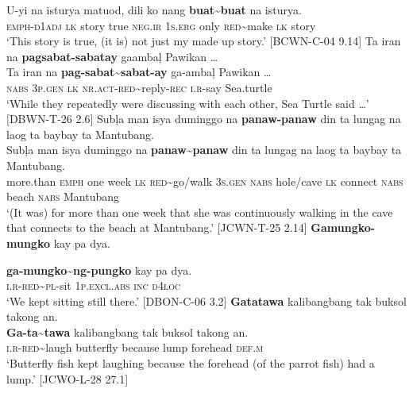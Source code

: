 \gll U-yi  na  isturya  matuod,  dili  ko  nang  \textbf{buat\sim{}buat}  na  isturya. \\
\textsc{emph-d}1\textsc{adj}  \textsc{lk}  story  true  \textsc{neg.ir} 1\textsc{s.erg} only  \textsc{red}\sim{}make  \textsc{lk}  story \\
\glt ‘This story is true, (it is) not just my made up story.’ [BCWN-C-04 9.14]
\z
\ea
Ta  iran  na  \textbf{pagsabat-sabatay}  gaambaļ  Pawikan … \\\smallskip
\gll Ta  iran  na  \textbf{pag-sabat\sim{}sabat-ay}  ga-ambaļ  Pawikan … \\
\textsc{nabs}  3\textsc{p.gen}  \textsc{lk}  \textsc{nr.act-red}\sim{}reply-\textsc{rec}  \textsc{i.r}-say  Sea.turtle \\
\glt ‘While they repeatedly were discussing with each other, Sea Turtle said …’ [DBWN-T-26 2.6]
\z
\ea
Subļa  man  isya  duminggo  na  \textbf{panaw-panaw}  din  ta lungag  na  laog  ta  baybay  ta  Mantubang. \\\smallskip
\gll Subļa  man  isya  duminggo  na  \textbf{panaw\sim{}panaw}  din  ta lungag  na  laog  ta  baybay  ta  Mantubang. \\
more.than  \textsc{emph}  one  week  \textsc{lk}  \textsc{red}\sim{}go/walk  3\textsc{s.gen}  \textsc{nabs}
hole/cave  \textsc{lk} connect  \textsc{nabs} beach  \textsc{nabs} Mantubang \\
\glt `(It was) for more than one week that she was continuously walking in the cave that connects to the beach at Mantubang.’ [JCWN-T-25 2.14]
\z
\ea
\textbf{Gamungko-mungko}  kay  pa  dya. \\\smallskip

\gll \textbf{ga-mungko\sim{}ng-pungko}\footnotemark{}  kay  pa  dya. \\
\textsc{i.r}-\textsc{red}\sim{}\textsc{pl}-sit    1\textsc{p.excl.abs} \textsc{inc}  \textsc{d}4\textsc{loc} \\
\glt ‘We kept sitting still there.’ [DBON-C-06 3.2]
\z
\ea
\textbf{Gatatawa}  kalibangbang  tak  buksol  takong  an. \\\smallskip
\gll \textbf{Ga-ta\sim{}tawa}  kalibangbang  tak  buksol  takong  an. \\
\textsc{i.r-red}\sim{}laugh  butterfly  because  lump  forehead  \textsc{def.m} \\
\glt ‘Butterfly fish kept laughing because the forehead (of the parrot fish) had a lump.’ [JCWO-L-28 27.1]
\z

